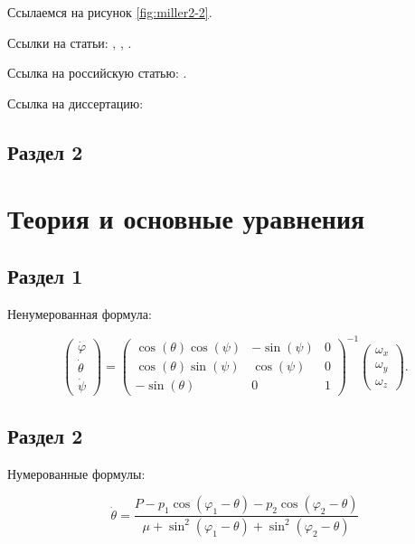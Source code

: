 \documentclass[a4paper,14pt]{extarticle}
\begin{document}
    Ссылаемся на рисунок \ref{fig:miller2-2}.
    
    Ссылки на статьи: \cite{miller1}, \cite{miller2}, \cite{mohseni1}.

    Ссылка на российскую статью: \cite{skubachevskii1}.

    Ссылка на диссертацию:  \cite{pavlichenko1}

\subsection{Раздел 2}

\pagebreak
\section{Теория и основные уравнения}

\subsection{Раздел 1}

Ненумерованная формула:

\begin{equation}
    \begin{pmatrix} \dot{\varphi}\\ \dot{\theta} \\ \dot{\psi} \end{pmatrix}
    = \begin{pmatrix}
        \cos(\theta)\cos(\psi) & -\sin(\psi) & 0 \\
        \cos(\theta)\sin(\psi) & \cos(\psi)  & 0 \\
        -\sin(\theta)         & 0         &  1
    \end{pmatrix}^{-1}
    \begin{pmatrix} \omega_x\\ \omega_y \\ \omega_z \end{pmatrix}. \nonumber
\end{equation}


\subsection{Раздел 2}

Нумерованные формулы:

\begin{equation}
\label{eq:1}
    \dot{\theta}=\frac{P-p_{1}\cos\left(\varphi_{1}-\theta\right)-p_{2}\cos\left(\varphi_{2}-\theta\right)}{\mu+\sin^{2}\left(\varphi_{1}-\theta\right)+\sin^{2}\left(\varphi_{2}-\theta\right)}
\end{equation}
\end{document}
